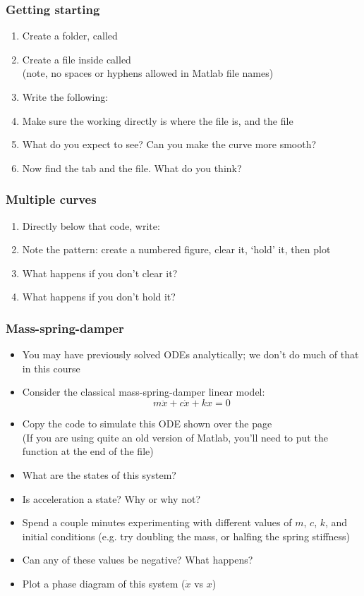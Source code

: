 \documentclass[9pt]{beamer-control}
\begin{document}
\begin{frame}
\frametitle{Getting starting}
\begin{enumerate}
\item Create a folder, called 
\item Create a file inside called \\(note, no spaces or hyphens allowed in Matlab file names)
\item Write the following:
\item Make sure the working directly is where the file is, and  the file
\item What do you expect to see? Can you make the curve more smooth?
\item Now find the  tab and  the file. What do you think?
\end{enumerate}
\end{frame}
\begin{frame}

\frametitle{Multiple curves}
\begin{enumerate}
\item Directly below that code, write:
\item Note the pattern: create a numbered figure, clear it, `hold' it, then plot
\item What happens if you don't clear it?
\item What happens if you don't hold it?
\end{enumerate}
\end{frame}


\begin{frame}
\frametitle{Mass-spring-damper}
\begin{itemize}
\item You may have previously solved ODEs analytically; we don't do much of that in this course
\item Consider the classical mass-spring-damper linear model:
\[
   m\ddot x + c\dot x + k x = 0
\] 
\item Copy the code to simulate this ODE shown over the page\\
 (If you are using quite an old version of Matlab, you'll need to put the function at the end of the file)
\item What are the states of this system?
\item Is acceleration a state? Why or why not?
\item Spend a couple minutes experimenting with different values of $m$, $c$, $k$, and initial conditions (e.g. try doubling the mass, or halfing the spring stiffness)
\item Can any of these values be negative? What happens?
\item Plot a phase diagram of this system ($\dot x$ vs $x$)
\end{itemize}
\end{frame}
\end{document}
